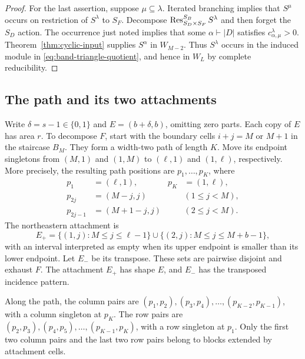 \begin{proof}
For the last assertion, suppose $\mu\subseteq\lambda$.
Iterated branching implies that $S^\mu$ occurs on restriction of
$S^\lambda$ to $S_F$.  Decompose
$\operatorname{Res}_{S_D\times S_F}^{S_B}S^\lambda$ and then forget the $S_D$
action.  The occurrence just noted implies that some
$\alpha\vdash|D|$ satisfies $c_{\alpha,\mu}^{\lambda}>0$.
Theorem~\ref{thm:cyclic-input} supplies $S^\alpha$ in $W_{M-2}$.
Thus $S^\lambda$ occurs in the induced module in
\eqref{eq:band-triangle-quotient}, and hence in $W_L$ by complete
reducibility.
\end{proof}

\subsection{The path and its two attachments}

Write $\delta=s-1\in\{0,1\}$ and $E=(b+\delta,b)$, omitting
zero parts.  Each copy of $E$ has area $r$.
To decompose $F$, start with the boundary cells $i+j=M$ or $M+1$
in the staircase $B_M$.  They form a width-two path of length $K$.
Move its endpoint singletons from $(M,1)$ and $(1,M)$ to
$(\ell,1)$ and $(1,\ell)$, respectively.  More precisely, the
resulting path positions are $p_1,\ldots,p_K$, where
\begin{align*}
 p_1&=(\ell,1),&p_K&=(1,\ell),\\
 p_{2j}&=(M-j,j) &&(1\le j<M),\\
 p_{2j-1}&=(M+1-j,j) &&(2\le j<M).
\end{align*}
The northeastern attachment is
\[
 E_+=\{(1,j):M\le j\le\ell-1\}
       \cup\{(2,j):M\le j\le M+b-1\},
\]
with an interval interpreted as empty when its upper endpoint is
smaller than its lower endpoint.  Let $E_-$ be its transpose.
These sets are pairwise disjoint and exhaust $F$.
The attachment $E_+$ has shape $E$, and $E_-$ has the transposed
incidence pattern.

Along the path, the column pairs are
$(p_1,p_2),(p_3,p_4),\ldots,(p_{K-2},p_{K-1})$, with a column
singleton at $p_K$.  The row pairs are
$(p_2,p_3),(p_4,p_5),\ldots,(p_{K-1},p_K)$, with a row singleton
at $p_1$.  Only the first two column pairs and the last two row
pairs belong to blocks extended by attachment cells.

